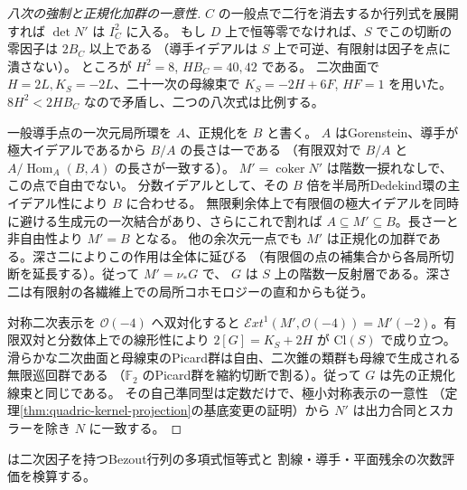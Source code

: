 \begin{proof}[八次の強制と正規化加群の一意性]
$C$ の一般点で二行を消去するか行列式を展開すれば $\det N'$ は $I_C^2$ に入る。
もし $D$ 上で恒等零でなければ、$S$ でこの切断の零因子は $2B_C$ 以上である
（導手イデアルは $S$ 上で可逆、有限射は因子を点に潰さない）。
ところが $H^2=8$, $H B_C=40,42$ である。
二次曲面で $H=2L,K_S=-2L$、二十一次の母線束で $K_S=-2H+6F$, $HF=1$ を用いた。
$8H^2<2HB_C$ なので矛盾し、二つの八次式は比例する。

一般導手点の一次元局所環を $A$、正規化を $B$ と書く。
$A$ はGorenstein、導手が極大イデアルであるから $B/A$ の長さは一である
（有限双対で $B/A$ と $A/\operatorname{Hom}_A(B,A)$ の長さが一致する）。
$M'=\operatorname{coker}N'$ は階数一捩れなしで、この点で自由でない。
分数イデアルとして、その $B$ 倍を半局所Dedekind環の主イデアル性により $B$ に合わせる。
無限剰余体上で有限個の極大イデアルを同時に避ける生成元の一次結合があり、さらにこれで割れば
$A\subseteq M'\subseteq B$。長さ一と非自由性より $M'=B$ となる。
他の余次元一点でも $M'$ は正規化の加群である。深さ二によりこの作用は全体に延びる
（有限個の点の補集合から各局所切断を延長する）。従って $M'=\nu_*G$ で、
$G$ は $S$ 上の階数一反射層である。深さ二は有限射の各繊維上での局所コホモロジーの直和からも従う。

対称二次表示を $\mathcal O(-4)$ へ双対化すると
$\mathcal Ext^1(M',\mathcal O(-4))=M'(-2)$。有限双対と分数体上での線形性により
$2[G]=K_S+2H$ が $\mathrm{Cl}(S)$ で成り立つ。
滑らかな二次曲面と母線束のPicard群は自由、二次錐の類群も母線で生成される無限巡回群である
（$\mathbb F_2$ のPicard群を縮約切断で割る）。従って $G$ は先の正規化線束と同じである。
その自己準同型は定数だけで、極小対称表示の一意性
（定理\ref{thm:quadric-kernel-projection}の基底変更の証明）から $N'$ は出力合同とスカラーを除き $N$ に一致する。
\end{proof}
 は二次因子を持つBezout行列の多項式恒等式と
割線・導手・平面残余の次数評価を検算する。
